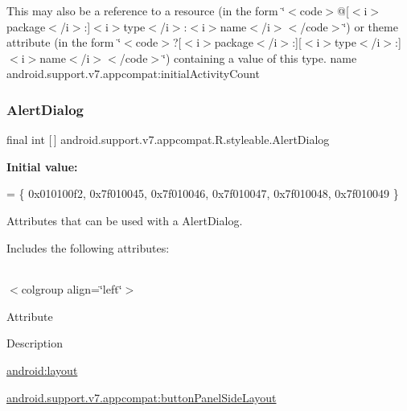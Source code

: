 This may also be a reference to a resource (in the form \char`\"{}$<$code$>$@\mbox{[}$<$i$>$package$<$/i$>$\+:\mbox{]}$<$i$>$type$<$/i$>$\+:$<$i$>$name$<$/i$>$$<$/code$>$\char`\"{}) or theme attribute (in the form \char`\"{}$<$code$>$?\mbox{[}$<$i$>$package$<$/i$>$\+:\mbox{]}\mbox{[}$<$i$>$type$<$/i$>$\+:\mbox{]}$<$i$>$name$<$/i$>$$<$/code$>$\char`\"{}) containing a value of this type.  name android.\+support.\+v7.\+appcompat\+:initial\+Activity\+Count \mbox{\label{classandroid_1_1support_1_1v7_1_1appcompat_1_1R_1_1styleable_a52dcd4f818920ef336f5b8033a2b34c1}} 
\subsubsection{\texorpdfstring{Alert\+Dialog}{AlertDialog}}
{\footnotesize\ttfamily final int \mbox{[}$\,$\mbox{]} android.\+support.\+v7.\+appcompat.\+R.\+styleable.\+Alert\+Dialog\hspace{0.3cm}{\ttfamily [static]}}

{\bfseries Initial value\+:}
\begin{DoxyCode}
= \{
            0x010100f2, 0x7f010045, 0x7f010046, 0x7f010047,
            0x7f010048, 0x7f010049
        \}
\end{DoxyCode}
Attributes that can be used with a Alert\+Dialog. 

Includes the following attributes\+:

\tabulinesep=1mm
\begin{longtabu} spread 0pt [c]{*{0}{|X[-1]}|}
\hline
\end{longtabu}
$<$colgroup align=\char`\"{}left\char`\"{}$>$ 

Attribute

Description 

{\ttfamily \hyperlink{classandroid_1_1support_1_1v7_1_1appcompat_1_1R_1_1styleable_a0a813a36efb918f7b9c367c3de19bf8a}{android\+:layout}}

{\ttfamily \hyperlink{classandroid_1_1support_1_1v7_1_1appcompat_1_1R_1_1styleable_ad40086bf4aa954bd7f5c4091ac88c6b1}{android.\+support.\+v7.\+appcompat\+:button\+Panel\+Side\+Layout}}

